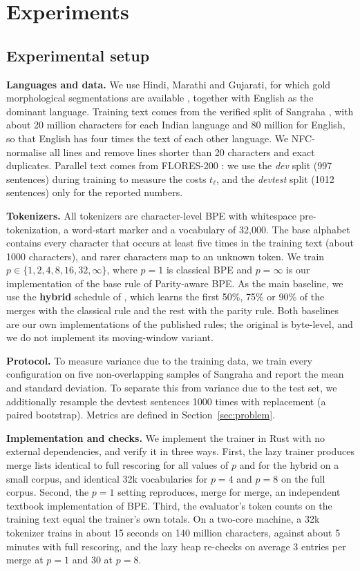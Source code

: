 \section{Experiments}
\label{sec:results}

\subsection{Experimental setup}
\label{sec:setup}

\noindent\textbf{Languages and data.}
We use Hindi, Marathi and Gujarati, for which gold morphological segmentations are
available \citep{rathore2026}, together with English as the dominant language. Training text
comes from the verified split of Sangraha \citep{khan2024}, with about 20 million characters
for each Indian language and 80 million for English, so that English has four times the text
of each other language. We NFC-normalise all lines and remove lines shorter than 20
characters and exact duplicates. Parallel text comes from FLORES-200 \citep{nllb2022}: we use
the \emph{dev} split (997 sentences) during training to measure the costs $t_\ell$, and the
\emph{devtest} split (1012 sentences) only for the reported numbers.

\noindent\textbf{Tokenizers.}
All tokenizers are character-level BPE with whitespace pre-tokenization, a word-start marker
and a vocabulary of 32{,}000. The base alphabet contains every character that occurs at least
five times in the training text (about 1000 characters), and rarer characters map to an
unknown token. We train $p\in\{1,2,4,8,16,32,\infty\}$, where $p=1$ is classical BPE and
$p=\infty$ is our implementation of the base rule of Parity-aware BPE. As the main baseline,
we use the \textbf{hybrid} schedule of \citet{foroutan2026}, which learns the first 50\%,
75\% or 90\% of the merges with the classical rule and the rest with the parity rule. Both
baselines are our own implementations of the published rules; the original is byte-level,
and we do not implement its moving-window variant.

\noindent\textbf{Protocol.}
To measure variance due to the training data, we train every configuration on five
non-overlapping samples of Sangraha and report the mean and standard deviation. To separate
this from variance due to the test set, we additionally resample the devtest sentences 1000
times with replacement (a paired bootstrap). Metrics are defined in
Section~\ref{sec:problem}.

\noindent\textbf{Implementation and checks.}
We implement the trainer in Rust with no external dependencies, and verify it in three ways.
First, the lazy trainer produces merge lists identical to full rescoring for all values of
$p$ and for the hybrid on a small corpus, and identical 32k vocabularies for $p=4$ and
$p=8$ on the full corpus. Second, the $p=1$ setting reproduces, merge for merge, an
independent textbook implementation of BPE. Third, the evaluator's token counts on the
training text equal the trainer's own totals. On a two-core machine, a 32k tokenizer trains
in about 15 seconds on 140 million characters, against about 5 minutes with full rescoring,
and the lazy heap re-checks on average 3 entries per merge at $p=1$ and 30 at $p=8$.

